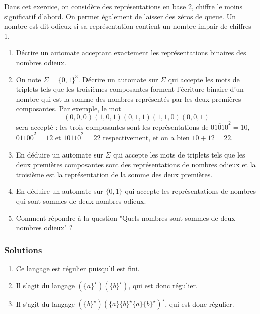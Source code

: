 \begin{exo}
Dans cet exercice, on considère des représentations en base 2, chiffre le moins significatif d'abord. On permet également de laisser des zéros de queue. Un nombre est dit odieux si sa représentation contient un nombre impair de chiffres 1.

\begin{enumerate}
\item Décrire un automate acceptant exactement les représentations binaires des nombres odieux.
\item On note $\Sigma = \{0, 1\}^3$. Décrire un automate sur $\Sigma$ qui accepte les mots de triplets tels que les troisièmes composantes forment l'écriture binaire d'un nombre qui est la somme des nombres représentés par les deux premières composantes. Par exemple, le mot
$$(0, 0, 0)(1, 0, 1)(0, 1, 1)(1, 1, 0)(0, 0, 1)$$
sera accepté : les trois composantes sont les représentations de $\overline{01010}^2 = 10$, $\overline{01100}^2 = 12$ et $\overline{10110}^2 = 22$ respectivement, et on a bien $10 + 12 = 22$.
\item En déduire un automate sur $\Sigma$ qui accepte les mots de triplets tels que les deux premières composantes sont des représentations de nombres odieux et la troisième est la représentation de la somme des deux premières.
\item En déduire un automate sur $\{0, 1\}$ qui accepte les représentations de nombres qui sont sommes de deux nombres odieux.
\item Comment répondre à la question "Quels nombres sont sommes de deux nombres odieux" ?
\end{enumerate}
\end{exo}

\subsubsection{Solutions}

\begin{sol}
\begin{enumerate}
\item Ce langage est régulier puisqu'il est fini.
\item Il s'agit du langage $(\{a\}^\star)(\{b\}^\star)$, qui est donc régulier.
\item Il s'agit du langage $(\{b\}^\star)(\{a\}\{b\}^\star\{a\}\{b\}^\star)^\star$, qui est donc régulier.
\end{enumerate}
\end{sol}

